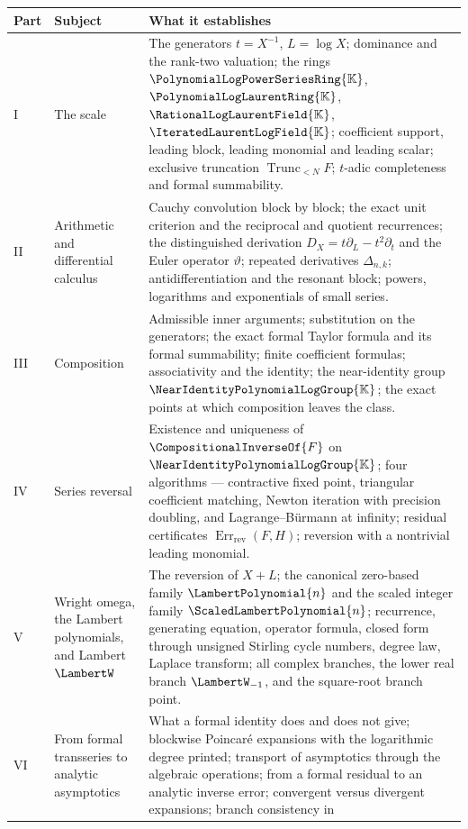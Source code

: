 \documentclass[11pt,oneside]{article}
\theoremstyle{plain}
\theoremstyle{definition}
\theoremstyle{remark}
\newcommand{\K}{\mathbb{K}}
\newcommand{\PLpow}{\PolynomialLogPowerSeriesRing{\K}}   %
\newcommand{\PLlau}{\PolynomialLogLaurentRing{\K}}       %
\newcommand{\PLrat}{\RationalLogLaurentField{\K}}        %
\newcommand{\PLit}{\IteratedLaurentLogField{\K}}         %
\newcommand{\Gnear}{\NearIdentityPolynomialLogGroup{\K}} %
\newcommand{\Trunc}[2]{\operatorname{Trunc}_{<#2}#1}     %
\newcommand{\DX}{D_{X}}                                  %
\newcommand{\EulerOp}{\vartheta}                         %
\newcommand{\shiftop}[2]{\Delta_{#1,#2}}                 %
\newcommand{\rev}[1]{\CompositionalInverseOf{#1}}
\newcommand{\LamP}[1]{\LambertPolynomial{#1}}
\newcommand{\LamPsc}[1]{\ScaledLambertPolynomial{#1}}
\newcommand{\RevErr}[2]{\operatorname{Err}_{\mathrm{rev}}\!\left(#1,#2\right)}
\begin{document}
\begin{center}
\begin{tabular}{@{}lp{}p{}@{}}
\hline
Part & Subject & What it establishes \\
\hline
I & The scale &
  The generators \(t=X^{-1}\), \(L=\log X\); dominance and the rank-two
  valuation; the rings \(\PLpow\), \(\PLlau\), \(\PLrat\), \(\PLit\);
  coefficient support, leading block, leading monomial and leading scalar;
  exclusive truncation \(\Trunc{F}{N}\); \(t\)-adic completeness and formal
  summability. \\
II & Arithmetic and differential calculus &
  Cauchy convolution block by block; the exact unit criterion and the
  reciprocal and quotient recurrences; the distinguished derivation
  \(\DX=t\partial_{L}-t^{2}\partial_{t}\) and the Euler operator \(\EulerOp\);
  repeated derivatives \(\shiftop{n}{k}\); antidifferentiation and the resonant
  block; powers, logarithms and exponentials of small series. \\
III & Composition &
  Admissible inner arguments; substitution on the generators; the exact formal
  Taylor formula and its formal summability; finite coefficient formulas;
  associativity and the identity; the near-identity group \(\Gnear\); the exact
  points at which composition leaves the class. \\
IV & Series reversal &
  Existence and uniqueness of \(\rev{F}\) on \(\Gnear\); four algorithms ---
  contractive fixed point, triangular coefficient matching, Newton iteration
  with precision doubling, and Lagrange--B\"urmann at infinity; residual
  certificates \(\RevErr{F}{H}\); reversion with a nontrivial leading
  monomial. \\
V & Wright omega, the Lambert polynomials, and Lambert \(\LambertW\) &
  The reversion of \(X+L\); the canonical zero-based family \(\LamP{n}\) and
  the scaled integer family \(\LamPsc{n}\); recurrence, generating equation,
  operator formula, closed form through unsigned Stirling cycle numbers, degree
  law, Laplace transform; all complex branches, the lower real branch
  \(\LambertW_{-1}\), and the square-root branch point. \\
VI & From formal transseries to analytic asymptotics &
  What a formal identity does and does not give; blockwise Poincar\'e
  expansions with the logarithmic degree printed; transport of asymptotics
  through the algebraic operations; from a formal residual to an analytic
  inverse error; convergent versus divergent expansions; branch consistency in

\end{tabular}
\end{center}
\end{document}
